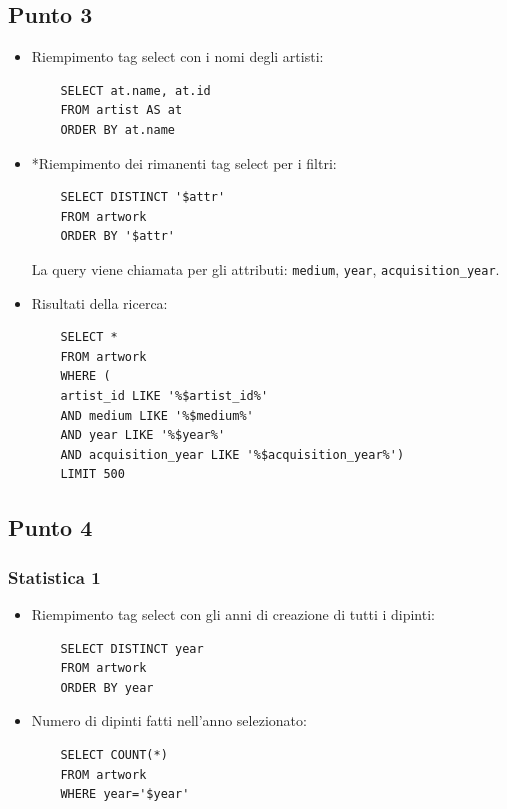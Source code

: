\documentclass{ol-softwaremanual}
\begin{document}
\subsection{Punto 3}
\begin{itemize}
    \item Riempimento tag select con i nomi degli artisti:
    \begin{verbatim}
    SELECT at.name, at.id
    FROM artist AS at
    ORDER BY at.name
    \end{verbatim}
    \item *Riempimento dei rimanenti tag select per i filtri:
    \begin{verbatim}
    SELECT DISTINCT '$attr' 
    FROM artwork
    ORDER BY '$attr'
    \end{verbatim}
    La query viene chiamata per gli attributi: \verb|medium|, \verb|year|, \verb|acquisition_year|.
    \item Risultati della ricerca:
    \begin{verbatim}
    SELECT *
    FROM artwork
    WHERE (
    artist_id LIKE '%$artist_id%' 
    AND medium LIKE '%$medium%'
    AND year LIKE '%$year%'
    AND acquisition_year LIKE '%$acquisition_year%')
    LIMIT 500
    \end{verbatim}
\end{itemize}

\newpage
\subsection{Punto 4}
\subsubsection{Statistica 1}
\begin{itemize}
    \item Riempimento tag select con gli anni di creazione di tutti i dipinti:
    \begin{verbatim}
    SELECT DISTINCT year 
    FROM artwork
    ORDER BY year
    \end{verbatim}
    \item Numero di dipinti fatti nell'anno selezionato:
    \begin{verbatim}
    SELECT COUNT(*)
    FROM artwork
    WHERE year='$year'
    \end{verbatim}
\end{itemize}
\end{document}
